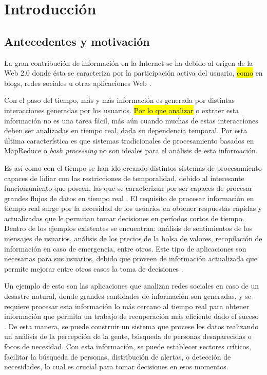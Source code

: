 \chapter{Introducción}
\label{cap:introduccion}

\section{Antecedentes y motivación}
\label{intro:motivacion}

La gran contribución de información en la Internet se ha debido al origen de la Web 2.0 donde ésta se caracteriza por la participación activa del usuario, \hl{como} en blogs, redes sociales u otras aplicaciones Web \citep{web2007oberhelman}.


Con el paso del tiempo, más y más información es generada por distintas interacciones generadas por los usuarios. \hl{Por lo que analizar} o extraer esta información no es una tarea fácil, más aún cuando muchas de estas interacciones deben ser analizadas en tiempo real, dada su dependencia temporal. Por esta última característica es que sistemas tradicionales de procesamiento basados en MapReduce \citep{2010Lin} o \textit{bash processing} \citep{HawwashN14} no son ideales para el análisis de esta información.

Es así como con el tiempo se han ido creando distintos sistemas de procesamiento capaces de lidiar con las restricciones de temporalidad, debido al interesante funcionamiento que poseen, las que se caracterizan por ser capaces de procesar grandes flujos de datos en tiempo real \citep{ChenZ14a}. El requisito de procesar informaci\'on en tiempo real surge por la necesidad de los usuarios en obtener respuestas r\'apidas y actualizadas que le permitan tomar decisiones en per\'iodos cortos de tiempo. Dentro de los ejemplos existentes se encuentran: análisis de sentimientos de los mensajes de usuarios, análisis de los precios de la bolsa de valores, recopilación de información en caso de emergencia, entre otros. Este tipo de aplicaciones son necesarias para sus usuarios, debido que proveen de información actualizada que permite mejorar entre otros casos la toma de decisiones \citep{Wenzel14}.

Un ejemplo de esto son las aplicaciones que analizan redes sociales en caso de un desastre natural, donde grandes cantidades de información son generadas, y se requiere procesar esta información lo más cercano al tiempo real para obtener información que permita un trabajo de recuperación más eficiente dado el suceso \citep{andrade2014fundamentals}. De esta manera, se puede construir un sistema que procese los datos realizando un análisis de la percepción de la gente, búsqueda de personas desaparecidas o focos de necesidad. Con esta información, se puede establecer sectores críticos, facilitar la búsqueda de personas, distribución de alertas, o detección de necesidades, lo cual es crucial para tomar decisiones en esos momentos.


